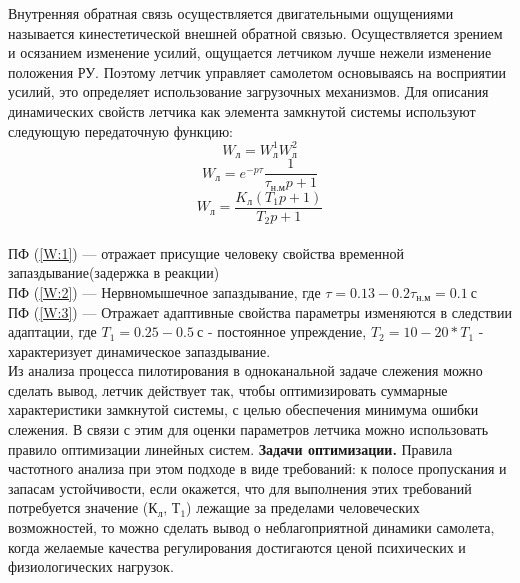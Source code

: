 \documentclass{article}
\begin{document}
Внутренняя обратная связь осуществляется двигательными ощущениями называется кинестетической внешней обратной связью. Осуществляется зрением и осязанием изменение усилий, ощущается летчиком лучше нежели изменение положения РУ. Поэтому летчик управляет самолетом основываясь на восприятии усилий, это определяет использование загрузочных механизмов. Для описания динамических свойств летчика как элемента замкнутой системы используют следующую передаточную функцию:
\begin{equation} \label{W:1}
W_л = W_л^1 W_л^2 
\end{equation}
\begin{equation} \label{W:2}
 W_л = e^{-p\tau} \frac{1}{\tau_{н.м} p +1} 
\end{equation}
\begin{equation} \label{W:3}
 W_л = \frac{K_л(T_1 p + 1)}{T_2 p +1}
\end{equation}\\
ПФ (\ref{W:1}) --- отражает присущие человеку свойства временной запаздывание(задержка в реакции)\\
ПФ (\ref{W:2}) --- Нервномышечное запаздывание, где $\tau = 0.13 - 0.2 \tau_{н.м}= 0.1 \ с$ \\
ПФ (\ref{W:3}) --- Отражает адаптивные свойства параметры изменяются в следствии адаптации, где $T_1 = 0.25 - 0.5 \ с$ - постоянное упреждение, $T_2 = 10 - 20 * T_1$ - характеризует динамическое запаздывание.\\
Из анализа процесса пилотирования в одноканальной задаче слежения можно сделать вывод, летчик действует так, чтобы оптимизировать суммарные характеристики замкнутой системы, с целью обеспечения минимума ошибки слежения. В связи с этим для оценки параметров летчика можно использовать правило оптимизации линейных систем.
\textbf{Задачи оптимизации.} Правила частотного анализа при этом подходе в виде требований: к полосе пропускания и запасам устойчивости, если окажется, что для выполнения этих требований потребуется значение ($К_л, \, Т_1$) лежащие за пределами человеческих возможностей, то можно сделать вывод о неблагоприятной динамики самолета, когда желаемые качества регулирования достигаются ценой психических и физиологических нагрузок.
\end{document}
